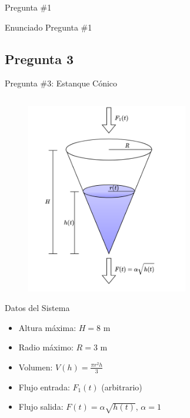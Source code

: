 \documentclass[
    10pt,
    aspectratio=169,
    xcolor={dvipsnames},
    spanish,
    ]{beamer}
\begin{document}
\begin{frame}{Pregunta \#1}
\begin{block}{Enunciado Pregunta \#1}
\begin{enumerate}
\section{Pregunta 3}
\begin{frame}{Pregunta \#3: Estanque Cónico}
\vspace{-0.35cm}
\begin{columns}
    \begin{column}{0.34\textwidth}
      \vspace{-0.2cm}
      \begin{figure}[ht]
          \centering
          \includegraphics[width=0.63\textwidth]{Figura_4.png} %
      \end{figure}
      \scriptsize
      \begin{block}{Datos del Sistema}
        \setlength\itemsep{0.1em}
        \begin{itemize}
            \item Altura máxima: $H = 8$ m
            \item Radio máximo: $R = 3$ m
            \item Volumen: $V(h) = \frac{\pi r^2 h}{3}$
            \item Flujo entrada: $F_1(t)$ (arbitrario)
            \item Flujo salida: $F(t) = \alpha \sqrt{h(t)}$, $\alpha = 1$
        \end{itemize}
      \end{block}
    \end{column}
    

\end{columns}
\end{frame}
\end{enumerate}
\end{block}
\end{frame}
\end{document}
